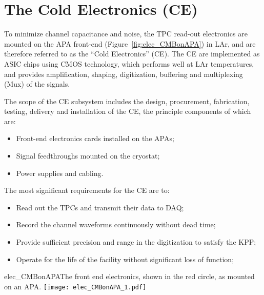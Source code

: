 \section{The Cold Electronics (CE)} 
\label{sec:detectors-fd-ref-ce}

To minimize channel capacitance and noise,
the TPC read-out electronics are mounted on the APA front-end (Figure~\ref{fig:elec_CMBonAPA})
in LAr, and are therefore referred to as the ``Cold Electronics'' (CE).
The CE are implemented as ASIC chips using CMOS technology,
which performs well at LAr temperatures,
and provides amplification, shaping, digitization, buffering and multiplexing (Mux) of the signals.

The scope of the CE subsystem includes the design, procurement, fabrication, testing,
delivery and installation of the CE, the principle components of which are:
\begin{itemize}
\item Front-end electronics cards installed on the APAs;
\item Signal feedthroughs mounted on the cryostat;
\item Power supplies and cabling.
\end{itemize}
The most significant requirements for the CE are to:
\begin{itemize}	
\item Read out the TPCs and transmit their data to DAQ;
\item Record the channel waveforms continuously without dead time;
\item Provide sufficient precision and range in the digitization to satisfy the KPP;
\item Operate for the life of the facility without significant loss of function;
\end{itemize}
\begin{cdrfigure}{elec_CMBonAPA}{The front end electronics,
shown in the red circle, as mounted on an APA.}
\texttt{[image: elec\_CMBonAPA\_1.pdf]}
\end{cdrfigure}

